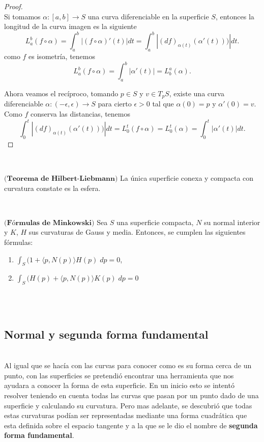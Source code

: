 \begin{proof}
	${}$\\
	
	Si tomamos $\alpha : [a,b] \to S$ una curva diferenciable en la superficie $S$, entonces la longitud de la curva imagen es la siguiente
	\[
	L^{b}_{a} (f \circ \alpha) = \int^{b}_{a} |(f \circ \alpha)'(t)| dt = \int^{b}_{a} |(df)_{\alpha(t)}(\alpha'(t)))| dt.
	\]
	como $f$ es isometría, tenemos
	\[
	L^{b}_{a} (f \circ \alpha) = \int^{b}_{a} |\alpha'(t)| = L^{a}_{b} (\alpha).
	\]
	
	Ahora veamos el recíproco, tomando $p \in S$ y $v \in T_p S$, existe una curva diferenciable $\alpha : (-\epsilon, \epsilon) \to S$ para cierto $\epsilon > 0$ tal que $\alpha(0) = p$ y $\alpha'(0) = v$. Como $f$ conserva las distancias, tenemos
	\[
	\int^{t}_{0}|(df)_{\alpha(t)}(\alpha'(t)))| dt = L^{t}_{0} (f \circ \alpha) = L^{t}_{0}(\alpha) = \int^{t}_{0} |\alpha'(t)|dt.
	\]
	
\end{proof}
${ }$\\

\begin{teorema} \label{teo:hil-lie}
	$\textbf{(Teorema de Hilbert-Liebmann)}$ La única superficie conexa y compacta con curvatura constate es la esfera.
\end{teorema}
${ }$\\


\begin{teorema}
	$\textbf{(Fórmulas de Minkowski)}$ Sea $S$ una superficie compacta, $N$ su normal interior y $K$, $H$ sus curvaturas de Gauss y media. Entonces, se cumplen las siguientes fórmulas:
	\begin{enumerate}
		\item $\int_S (1 + \langle p, N(p) \rangle H(p) \; dp = 0$,
		\item $\int_S (H(p) + \langle p, N(p) \rangle K(p) \; dp = 0$
	\end{enumerate}
\end{teorema}
${ }$\\

${ }$\\
\subsection{Normal y segunda forma fundamental}
${ }$\\

Al igual que se hacía con las curvas para conocer como es su forma cerca de un punto, con las superficies se pretendió encontrar una herramienta que nos ayudara a conocer la forma de esta superficie. En un inicio esto se intentó resolver teniendo en cuenta todas las curvas que pasan por un punto dado de una superficie y calculando su curvatura. Pero mas adelante, se descubrió que todas estas curvaturas podían ser representadas mediante una forma cuadrática que esta definida sobre el espacio tangente y a la que se le dio el nombre de \textbf{segunda forma fundamental}.
${ }$\\

